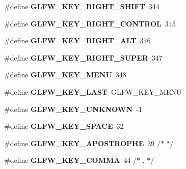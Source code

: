 \begin{DoxyCompactItemize}
\item 
\mbox{\label{group__keys_gaffca36b99c9dce1a19cb9befbadce691}} 
\#define {\bfseries G\+L\+F\+W\+\_\+\+K\+E\+Y\+\_\+\+R\+I\+G\+H\+T\+\_\+\+S\+H\+I\+FT}~344
\item 
\mbox{\label{group__keys_gad1ca2094b2694e7251d0ab1fd34f8519}} 
\#define {\bfseries G\+L\+F\+W\+\_\+\+K\+E\+Y\+\_\+\+R\+I\+G\+H\+T\+\_\+\+C\+O\+N\+T\+R\+OL}~345
\item 
\mbox{\label{group__keys_ga687b38009131cfdd07a8d05fff8fa446}} 
\#define {\bfseries G\+L\+F\+W\+\_\+\+K\+E\+Y\+\_\+\+R\+I\+G\+H\+T\+\_\+\+A\+LT}~346
\item 
\mbox{\label{group__keys_gad4547a3e8e247594acb60423fe6502db}} 
\#define {\bfseries G\+L\+F\+W\+\_\+\+K\+E\+Y\+\_\+\+R\+I\+G\+H\+T\+\_\+\+S\+U\+P\+ER}~347
\item 
\mbox{\label{group__keys_ga9845be48a745fc232045c9ec174d8820}} 
\#define {\bfseries G\+L\+F\+W\+\_\+\+K\+E\+Y\+\_\+\+M\+E\+NU}~348
\item 
\mbox{\label{group__keys_ga442cbaef7bfb9a4ba13594dd7fbf2789}} 
\#define {\bfseries G\+L\+F\+W\+\_\+\+K\+E\+Y\+\_\+\+L\+A\+ST}~G\+L\+F\+W\+\_\+\+K\+E\+Y\+\_\+\+M\+E\+NU
\item 
\mbox{\label{group__keys_ga99aacc875b6b27a072552631e13775c7}} 
\#define {\bfseries G\+L\+F\+W\+\_\+\+K\+E\+Y\+\_\+\+U\+N\+K\+N\+O\+WN}~-\/1
\item 
\mbox{\label{group__keys_gaddb2c23772b97fd7e26e8ee66f1ad014}} 
\#define {\bfseries G\+L\+F\+W\+\_\+\+K\+E\+Y\+\_\+\+S\+P\+A\+CE}~32
\item 
\mbox{\label{group__keys_ga6059b0b048ba6980b6107fffbd3b4b24}} 
\#define {\bfseries G\+L\+F\+W\+\_\+\+K\+E\+Y\+\_\+\+A\+P\+O\+S\+T\+R\+O\+P\+HE}~39  /$\ast$ \textquotesingle{} $\ast$/
\item 
\mbox{\label{group__keys_gab3d5d72e59d3055f494627b0a524926c}} 
\#define {\bfseries G\+L\+F\+W\+\_\+\+K\+E\+Y\+\_\+\+C\+O\+M\+MA}~44  /$\ast$ , $\ast$/
\item 

\end{DoxyCompactItemize}
